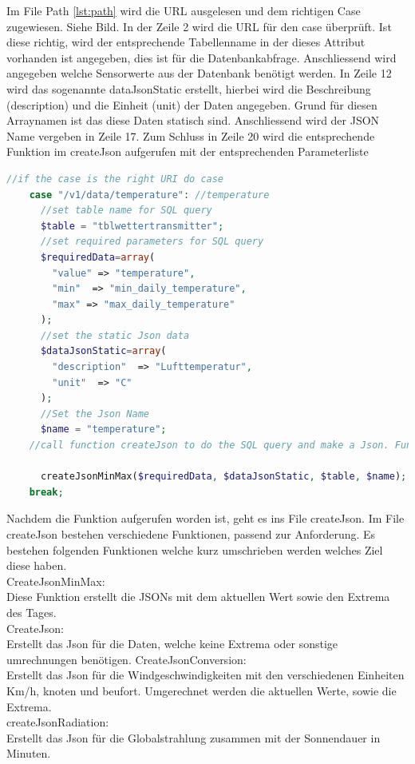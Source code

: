 Im File Path \ref{lst:path} wird die URL ausgelesen und dem richtigen Case zugewiesen. Siehe Bild. In der Zeile 2 wird die URL für den case überprüft. Ist diese richtig, wird der entsprechende Tabellenname in der dieses Attribut vorhanden ist angegeben, dies ist für die Datenbankabfrage. Anschliessend wird angegeben welche Sensorwerte aus der Datenbank benötigt werden. In Zeile 12 wird das sogenannte dataJsonStatic erstellt, hierbei wird die Beschreibung (description) und die Einheit (unit) der Daten angegeben. Grund für diesen Arraynamen ist das diese Daten statisch sind. Anschliessend wird der JSON Name vergeben in Zeile 17. Zum Schluss in Zeile 20 wird die entsprechende Funktion im createJson aufgerufen mit der entsprechenden Parameterliste

\begin{lstlisting}[label=lst:path,caption=Beispiel Case zuweisung, language=php, style=php]
  //if the case is the right URI do case
    case "/v1/data/temperature": //temperature
      //set table name for SQL query
      $table = "tblwettertransmitter";
      //set required parameters for SQL query
      $requiredData=array(
        "value" => "temperature",
        "min"  => "min_daily_temperature",
        "max" => "max_daily_temperature"
      );
      //set the static Json data
      $dataJsonStatic=array(
        "description"  => "Lufttemperatur",
        "unit"  => "C"
      );
      //Set the Json Name
      $name = "temperature";
    //call function createJson to do the SQL query and make a Json. Function is in file createJson.php

      createJsonMinMax($requiredData, $dataJsonStatic, $table, $name);
    break;
\end{lstlisting}

Nachdem die Funktion aufgerufen worden ist, geht es ins File createJson. Im File createJson bestehen verschiedene Funktionen, passend zur Anforderung. Es bestehen folgenden Funktionen welche kurz umschrieben werden welches Ziel diese haben.\\

CreateJsonMinMax:\\
Diese Funktion erstellt die JSONs mit dem aktuellen Wert sowie den Extrema des Tages.\\
CreateJson:\\
Erstellt das Json für die Daten, welche keine Extrema oder sonstige umrechnungen benötigen.
CreateJsonConversion:\\
Erstellt das Json für die Windgeschwindigkeiten mit den verschiedenen Einheiten Km/h, knoten und beufort. Umgerechnet werden die aktuellen Werte, sowie die Extrema.\\
createJsonRadiation:\\
Erstellt das Json für die Globalstrahlung zusammen mit der Sonnendauer in Minuten.\\

